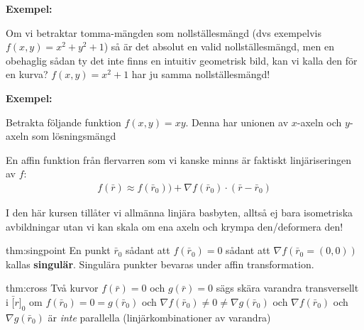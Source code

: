 \par\bigskip
\noindent\textbf{Exempel:}\par
\noindent Om vi betraktar tomma-mängden som nollställesmängd (dvs exempelvis $f(x,y) = x^2+y^2+1$) så är det absolut en valid nollställesmängd, men en obehaglig sådan ty det inte finns en intuitiv geometrisk bild, kan vi kalla den för en kurva? $f(x,y) = x^2+1$ har ju samma nollställesmängd!
\par\bigskip
\noindent\textbf{Exempel:}\par
\noindent Betrakta följande funktion $f(x,y)=xy$. Denna har unionen av $x$-axeln och $y$-axeln som lösningsmängd
\par\bigskip
\noindent En affin funktion från flervarren som vi kanske minns är faktiskt linjäriseringen av $f$:
\begin{equation*}
  \begin{gathered}
    f(\bar{r})\approx f(\bar{r}_0))+\nabla f(\bar{r}_0)\cdot (\bar{r}-\bar{r}_0)
  \end{gathered}
\end{equation*}
\par\bigskip
\noindent I den här kursen tillåter vi allmänna linjära basbyten, alltså ej bara isometriska avbildningar utan vi kan skala om ena axeln och krympa den/deformera den!
\par\bigskip
\begin{theo}{thm:singpoint}
  En punkt $\bar{r}_0$ sådant att $f(\bar{r}_0)=0$ sådant att $\nabla f(\bar{r}_0=(0,0))$ kallas \textbf{singulär}. Singulära punkter bevaras under affin transformation. 
\end{theo}
\par\bigskip
\begin{theo}{thm:cross}
  Två kurvor $f(\bar{r})= 0$ och $g(\bar{r})=0$ sägs skära varandra transversellt i $\bar[r]_0$ om $f(\bar{r}_0) = 0 = g(\bar{r}_0)$ och $\nabla f(\bar{r}_0) \neq 0 \neq \nabla g(\bar{r}_0)$ och $\nabla f(\bar{r}_0)$ och $\nabla g(\bar{r}_0)$ är \textit{inte} parallella (linjärkombinationer av varandra)
\end{theo}
